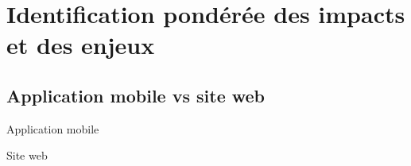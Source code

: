 \section{Identification pondérée des impacts et des enjeux}
	\subsection{Application mobile vs site web}
	\lipsumC

	\begin{table}[hp]
		\centering
		\caption{Application mobile}
		
		\label{tab.app+}
	\end{table}
	
	\begin{table}[hp]
		\centering
		\caption{Site web}
		
		\label{tab.app-}
	\end{table}
	
%		

\begin{comment}
	http://www.texample.net/tikz/examples/servers/
	http://www.texample.net/tikz/examples/computer-science-mindmap/
	http://www.texample.net/tikz/examples/decision-tree/
	http://www.texample.net/tikz/examples/energy-levels/
	http://www.texample.net/tikz/examples/filesystem-tree/
	http://www.texample.net/tikz/examples/mindmap/
	http://www.texample.net/tikz/examples/scenario-tree/
	http://www.texample.net/tikz/examples/work-breakdown-structure/
\end{comment}